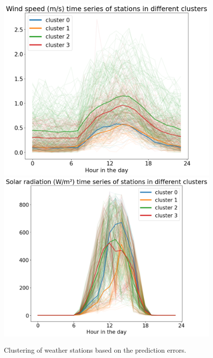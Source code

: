\documentclass[a4paper,fleqn]{cas-sc}
\begin{document}
\iffalse
\begin{figure}[!h]
	\centering
	\includegraphics[scale=0.2]{figs/new_figs/windspeed.png}
	\includegraphics[scale=0.2]{figs/new_figs/solarradiation.png}
	\caption{Clustering of weather stations based on the prediction errors.}
	\label{FIG:windspeedbox}
\end{figure}
\end{document}
